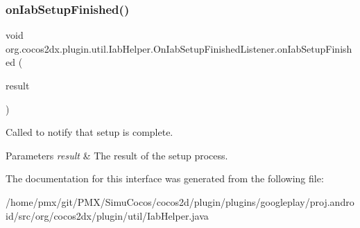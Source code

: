 \subsubsection{\texorpdfstring{on\+Iab\+Setup\+Finished()}{onIabSetupFinished()}}
{\footnotesize\ttfamily void org.\+cocos2dx.\+plugin.\+util.\+Iab\+Helper.\+On\+Iab\+Setup\+Finished\+Listener.\+on\+Iab\+Setup\+Finished (\begin{DoxyParamCaption}\item[{\hyperlink{classorg_1_1cocos2dx_1_1plugin_1_1util_1_1IabResult}{Iab\+Result}}]{result }\end{DoxyParamCaption})}

Called to notify that setup is complete.


\begin{DoxyParams}{Parameters}
{\em result} & The result of the setup process. \\
\hline
\end{DoxyParams}


The documentation for this interface was generated from the following file\+:\begin{DoxyCompactItemize}
\item 
/home/pmx/git/\+P\+M\+X/\+Simu\+Cocos/cocos2d/plugin/plugins/googleplay/proj.\+android/src/org/cocos2dx/plugin/util/Iab\+Helper.\+java\end{DoxyCompactItemize}
